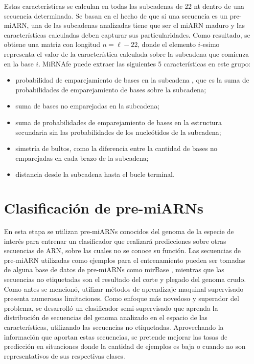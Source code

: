 Estas características se calculan en todas las subcadenas de 22 nt dentro de una secuencia determinada. Se basan en el hecho de que si una secuencia es un
pre-miARN, una de las subcadenas analizadas tiene que ser el miARN maduro y las características calculadas deben capturar sus particularidades. Como
resultado, se obtiene una matriz con longitud $ n = \ell - 22 $, donde el elemento $i$-esimo representa el valor de la característica calculada sobre la
subcadena que comienza en la base $i$. MiRNAfe puede extraer las siguientes 5 características en este grupo:
\begin{itemize}
	\item probabilidad de emparejamiento de bases en la subcadena \citep{lim2003}, que es la suma de probabilidades de emparejamiento de bases sobre la subcadena;
	\item suma de bases no emparejadas en la subcadena;
	\item suma de probabilidades de emparejamiento de bases en la estructura secundaria sin las probabilidades de los nucleótidos de la subcadena;
	\item simetría de bultos, como la diferencia entre la cantidad de bases no emparejadas en cada brazo de la subcadena;
	\item distancia desde la subcadena hasta el bucle terminal.
\end{itemize}

\section{Clasificación de pre-miARNs}

En esta etapa se utilizan pre-miARNs conocidos del genoma de la especie de interés para entrenar un clasificador que realizará predicciones sobre otras
secuencias de ARN, sobre las cuales no se  conoce su función. Las secuencias de pre-miARN utilizadas como ejemplos para el entrenamiento pueden ser tomadas de
alguna base de datos de pre-miARNs como  mirBase \citep{kozomara2014mirbase}, mientras que las secuencias no etiquetadas son el resultado del corte y plegado
del genoma crudo. Como antes se mencionó, utilizar métodos de aprendizaje maquinal supervisado presenta numerosas limitaciones. Como enfoque más novedoso y
superador del problema, se desarrolló un clasificador semi-supervisado que aprenda la distribución de secuencias del genoma analizado en el espacio de las
características, utilizando las secuencias no etiquetadas. Aprovechando la información que aportan estas secuencias, se pretende mejorar las tasas de predicción
en situaciones donde la cantidad de ejemplos es baja o cuando no son representativos de sus respectivas clases.

